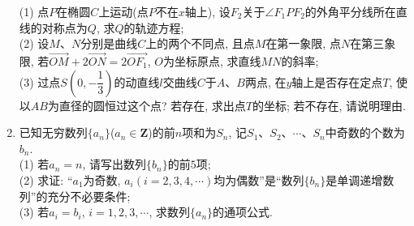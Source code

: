 \documentclass[10pt,a4paper]{article}
\begin{document}
\begin{enumerate}[1.]
(1) 点$P$在椭圆$C$上运动(点$P$不在$x$轴上), 设$F_2$关于$\angle F_1PF_2$的外角平分线所在直线的对称点为$Q$, 求$Q$的轨迹方程;\\
(2) 设$M$、$N$分别是曲线$C$上的两个不同点, 且点$M$在第一象限, 点$N$在第三象限, 若$\overrightarrow{OM}+2\overrightarrow{ON}=2\overrightarrow{OF_1}$, $O$为坐标原点, 求直线$MN$的斜率;\\
(3) 过点$S(0,-\dfrac 13)$的动直线$l$交曲线$C$于$A$、$B$两点, 在$y$轴上是否存在定点$T$, 使以$AB$为直径的圆恒过这个点? 若存在, 求出点$T$的坐标; 若不存在, 请说明理由.
\item 已知无穷数列$\{a_n\}$($a_n\in \mathbf{Z}$)的前$n$项和为$S_n$, 记$S_1$、$S_2$、$\cdots$、$S_n$中奇数的个数为$b_n$.\\
(1) 若$a_n=n$, 请写出数列$\{b_n\}$的前$5$项;\\
(2) 求证: ``$a_1$为奇数, $a_i(i=2,3,4,\cdots)$均为偶数''是``数列$\{b_n\}$是单调递增数列''的充分不必要条件;\\
(3) 若$a_i=b_i$, $i=1,2,3,\cdots$, 求数列$\{a_n\}$的通项公式.




\end{enumerate}
\end{document}
